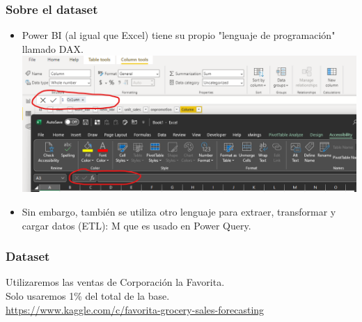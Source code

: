 \documentclass{beamer}
\begin{document}
\begin{frame}
	\frametitle{Sobre el dataset}
	\begin{itemize}
		\item Power BI (al igual que Excel) tiene su propio "lenguaje de programación" llamado DAX. \\
		\includegraphics[scale=0.35]{excel.png} \\
		\item Sin embargo, también se utiliza otro lenguaje para extraer, transformar y cargar datos (ETL): M que es usado en Power Query.
	\end{itemize}

\end{frame}

\begin{frame}
	\frametitle{Dataset}
	Utilizaremos las ventas de Corporación la Favorita. \\
	Solo usaremos 1\% del total de la base. \\
	\small{\url{https://www.kaggle.com/c/favorita-grocery-sales-forecasting}}
	
\end{frame}
\end{document}
